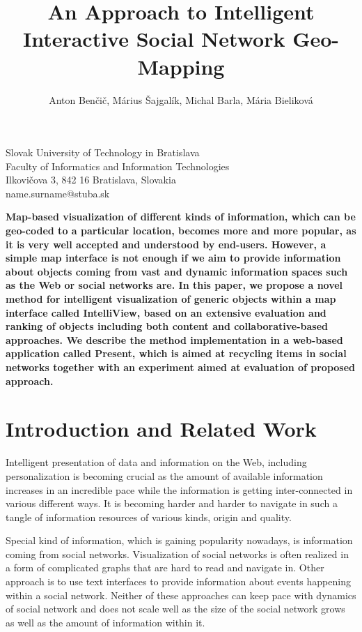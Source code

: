 \documentclass[6pt]{article}
\begin{document}
\title{\bf \Large An Approach to Intelligent Interactive Social Network Geo-Mapping \normalsize \rm}

\author{Anton Benčič, Márius Šajgalík, Michal Barla, Mária Bieliková}
\date{}
\maketitle
\begin{center}
Slovak University of Technology in Bratislava\\
Faculty of Informatics and Information Technologies\\
Ilkovičova 3, 842 16 Bratislava, Slovakia\\
{name.surname}@stuba.sk\\
\end{center}



\bf \abstractname \rm { Map-based visualization of different kinds of information, which can be geo-coded to a particular location, becomes more and more popular, as it is very well accepted and understood by end-users. However, a simple map interface is not enough if we aim to provide information about objects coming from vast and dynamic information spaces such as the Web or social networks are. In this paper, we propose a novel method for intelligent visualization of generic objects within a map interface called IntelliView, based on an extensive evaluation and ranking of objects including both content and collaborative-based approaches. We describe the method implementation in a web-based application called Present, which is aimed at recycling items in social networks together with an experiment aimed at evaluation of proposed approach.}
 
\section{Introduction and Related Work}
Intelligent presentation of data and information on the Web, including personalization is becoming crucial as the amount of available information increases in an incredible pace while the information is getting inter-connected in various different ways. It is becoming harder and harder to navigate in such a tangle of information resources of various kinds, origin and quality.

Special kind of information, which is gaining popularity nowadays, is information coming from social networks. Visualization of social networks is often realized in a form of complicated graphs that are hard to read and navigate in. Other approach is to use text interfaces to provide information about events happening within a social network. Neither of these approaches can keep pace with dynamics of social network and does not scale well as the size of the social network grows as well as the amount of information within it.
\end{document}
